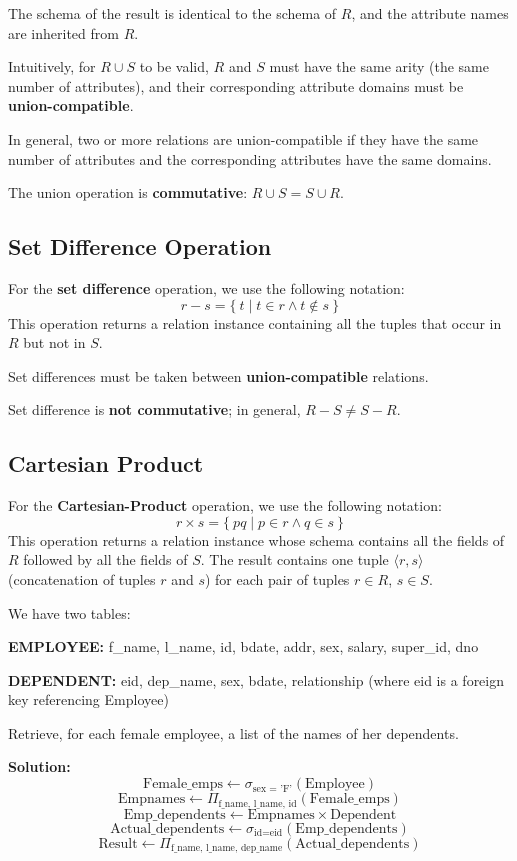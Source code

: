 The schema of the result is identical to the schema of \(R\), and the attribute names are inherited from \(R\). 

Intuitively, for \(R \cup S\) to be valid, \(R\) and \(S\) must have the same arity (the same number of attributes), and their corresponding attribute domains must be \textbf{union-compatible}. 

In general, two or more relations are union-compatible if they have the same number of attributes and the corresponding attributes have the same domains.

\begin{remark}
  The union operation is \textbf{commutative}: \(R \cup S = S \cup R\). 
\end{remark}

\subsection{Set Difference Operation}
For the \textbf{set difference} operation, we use the following notation: 
\[
  r - s = \{\ t \mid t \in r \land t \notin s \ \}
\]
This operation returns a relation instance containing all the tuples that occur in \(R\) but not in \(S\). 

\begin{remark}
  Set differences must be taken between \textbf{union-compatible} relations.
\end{remark}

Set difference is \textbf{not commutative}; in general, \(R - S \neq S - R\).

\subsection{Cartesian Product}
For the \textbf{Cartesian-Product} operation, we use the following notation: 
\[
  r \times s = \{\ pq \mid p \in r \land q \in s\ \}
\]
This operation returns a relation instance whose schema contains all the fields of \(R\) followed by all the fields of \(S\). The result contains one tuple \(\langle r, s \rangle\) (concatenation of tuples \(r\) and \(s\)) for each pair of tuples \(r \in R\), \(s \in S\).

\begin{eg}
We have two tables: 

\textbf{EMPLOYEE:} f\_name, l\_name, id, bdate, addr, sex, salary, super\_id, dno 

\textbf{DEPENDENT:} eid, dep\_name, sex, bdate, relationship (where eid is a foreign key referencing Employee)

Retrieve, for each female employee, a list of the names of her dependents. 

\textbf{Solution:} 
\[
  \text{Female\_emps} \leftarrow \sigma_{\text{sex = 'F'}}(\text{Employee})
\] 
\[
  \text{Empnames} \leftarrow \Pi_{\text{f\_name, l\_name, id}}(\text{Female\_emps})
\] 
\[
  \text{Emp\_dependents} \leftarrow \text{Empnames} \times \text{Dependent}
\] 
\[
  \text{Actual\_dependents} \leftarrow \sigma_{\text{id} = \text{eid}} (\text{Emp\_dependents})
\] 
\[
  \text{Result} \leftarrow \Pi_{\text{f\_name, l\_name, dep\_name}} (\text{Actual\_dependents})
\]
\end{eg} 


